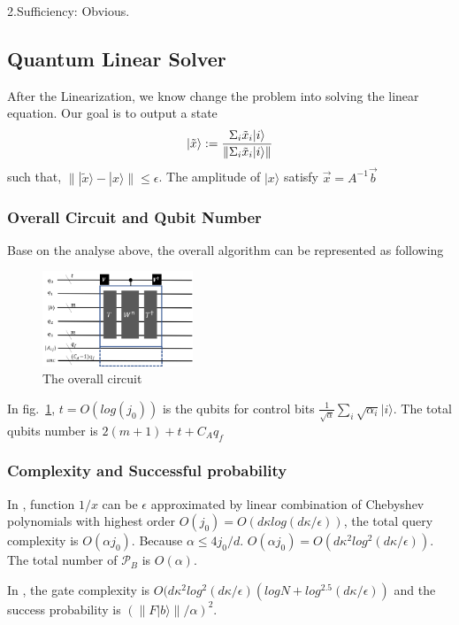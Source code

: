 \documentclass[%
 reprint,
 amsmath,amssymb,
pra,
]{revtex4-1}
\begin{document}
2.Sufficiency: Obvious.

\subsection{Quantum Linear Solver}

After the Linearization, we know change the problem into solving the linear
equation. Our goal is to output a state 
\begin{equation}
|\tilde{x}\rangle:=\frac{\Sigma_i \tilde{x}_i|i\rangle}
{\lVert \Sigma_i \tilde{x}_i |i\rangle\rVert}\notag
\end{equation}
such that, $\lVert |\tilde{x}\rangle-|x\rangle\rVert\leqslant\epsilon$. 
The amplitude of $|x\rangle$ satisfy $\vec{x}=A^{-1}\vec{b}$

\subsubsection{Overall Circuit and Qubit Number}
Base on the analyse above, the overall algorithm can be represented as 
following
\begin{figure}[htbp]
\centering
\includegraphics[width=0.4\textwidth]{Fig/overall}
\caption{The overall circuit}
\label{o}
\end{figure}

In fig.~\ref{o}, $t=O(log(j_0))$ is the qubits for control bits  $\frac{1}
{\sqrt{\alpha}}\sum_i\sqrt{\alpha_i}|i\rangle$. The total qubits number is $2(m+1)+t+C_Aq_f$

\subsubsection{Complexity and Successful probability}
In \cite{doi:10.1137/16M1087072}, function $1/x$ can be $\epsilon$ approximated by
linear combination of Chebyshev polynomials with highest order 
$O(j_0)=O(d\kappa log(d\kappa/\epsilon))$, the total
query complexity is $O(\alpha j_0)$. Because $\alpha\leqslant 4j_0/d$.
$O(\alpha j_0)=O(d\kappa^2log^2(d\kappa/\epsilon))$. The total number of 
$\mathcal{P}_B$ is $O(\alpha)$.

In \cite{7354428}, the gate complexity is $O(d\kappa^2log^2(d\kappa/
\epsilon)(logN+log^{2.5}(d\kappa/\epsilon))$
and the success probability is 
$(\lVert F|b\rangle\rVert/\alpha)^2$. 
\end{document}

